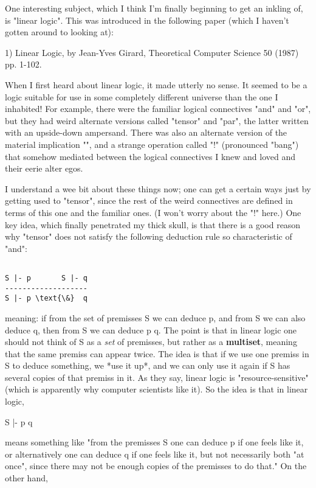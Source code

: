 One interesting subject, which I think I'm finally beginning to get an
inkling of, is "linear logic".  This was introduced in the following
paper (which I haven't gotten around to looking at):

1) Linear Logic, by Jean-Yves Girard, Theoretical Computer Science 50
(1987) pp. 1-102.

When I first heard about linear logic, it made utterly no sense.  It
seemed to be a logic suitable for use in some completely different
universe than the one I inhabited!  For example, there were the familiar
logical connectives "and" and "or", but they had weird alternate
versions called "tensor" and "par", the latter written with an
upside-down ampersand.  There was also an alternate version of 
the material implication "\to ", and a strange operation called "!"
(pronounced "bang") that somehow mediated between the logical
connectives I knew and loved and their eerie alter egos. 

I understand a wee bit about these things now; one can get a certain
ways just by getting used to "tensor", since the rest of the weird
connectives are defined in terms of this one and the familiar ones.
(I won't worry about the "!" here.)  One key idea, which finally
penetrated my thick skull, is that there is a good reason why "tensor"
does not satisfy the following deduction rule so characteristic of "and": 


\begin{verbatim}

S |- p       S |- q
-------------------
S |- p \text{\&}  q
\end{verbatim}
    

meaning: if from the set of premisses S we can deduce p, and from S we
can also deduce q, then from S we can deduce p\text{\&} q.  The point is that in
linear logic one should not think of S as a \emph{set} of premisses, but
rather as a \textbf{multiset}, meaning that the same premiss can appear twice.
The idea is that if we use one premiss in S to deduce something, we *use
it up*, and we can only use it again if S has several copies of that
premiss in it.  As they say, linear logic is "resource-sensitive" (which
is apparently why computer scientists like it).  So the idea is that in
linear logic,

S |- p\text{\&} q

means something like "from the premisses S one can deduce p if one feels
like it, or alternatively one can deduce q if one feels like it, but not
necessarily both "at once", since there may not be enough copies of the
premisses to do that."   On the other hand, 

